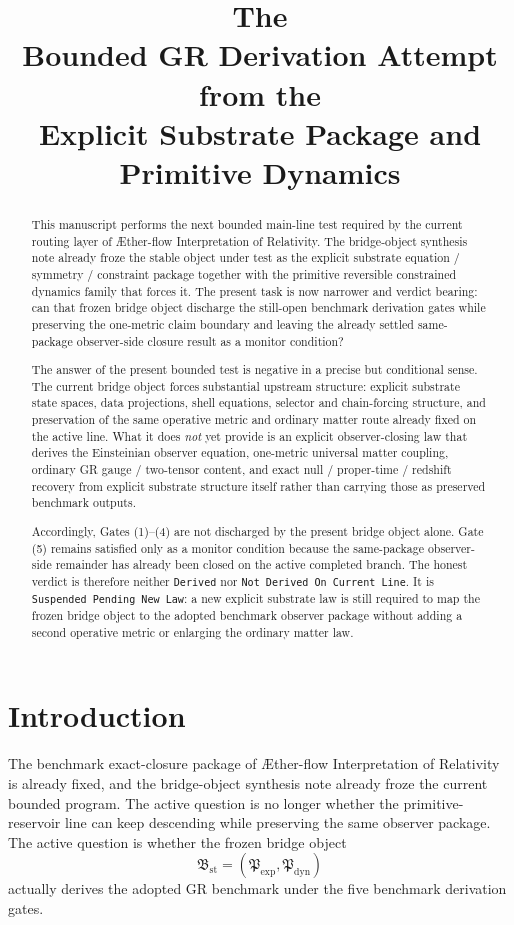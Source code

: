 \documentclass[11pt]{article}
\title{\textbf{The \TheoryName{}}\\[0.4em]
\large Bounded GR Derivation Attempt from the\\
\large Explicit Substrate Package and Primitive Dynamics}
\author{}
\date{}
\newcommand{\Aflow}{\AE{}ther-flow}
\newcommand{\TheoryName}{\Aflow{} Interpretation of Relativity}
\newcommand{\ExplicitPackage}{\mathfrak P_{\mathrm{exp}}}
\newcommand{\PrimitiveFamily}{\mathfrak P_{\mathrm{dyn}}}
\newcommand{\StableBridgeObject}{\mathfrak B_{\mathrm{st}}}
\begin{document}
\maketitle

\begin{abstract}
This manuscript performs the next bounded main-line test required by the current routing layer of \TheoryName{}. The bridge-object synthesis note already froze the stable object under test as the explicit substrate equation / symmetry / constraint package together with the primitive reversible constrained dynamics family that forces it. The present task is now narrower and verdict bearing: can that frozen bridge object discharge the still-open benchmark derivation gates while preserving the one-metric claim boundary and leaving the already settled same-package observer-side closure result as a monitor condition?

The answer of the present bounded test is negative in a precise but conditional sense. The current bridge object forces substantial upstream structure: explicit substrate state spaces, data projections, shell equations, selector and chain-forcing structure, and preservation of the same operative metric and ordinary matter route already fixed on the active line. What it does \emph{not} yet provide is an explicit observer-closing law that derives the Einsteinian observer equation, one-metric universal matter coupling, ordinary GR gauge / two-tensor content, and exact null / proper-time / redshift recovery from explicit substrate structure itself rather than carrying those as preserved benchmark outputs.

Accordingly, Gates (1)--(4) are not discharged by the present bridge object alone. Gate (5) remains satisfied only as a monitor condition because the same-package observer-side remainder has already been closed on the active completed branch. The honest verdict is therefore neither \texttt{Derived} nor \texttt{Not Derived On Current Line}. It is \texttt{Suspended Pending New Law}: a new explicit substrate law is still required to map the frozen bridge object to the adopted benchmark observer package without adding a second operative metric or enlarging the ordinary matter law.
\end{abstract}

\section{Introduction}

The benchmark exact-closure package of \TheoryName{} is already fixed, and the bridge-object synthesis note already froze the current bounded program. The active question is no longer whether the primitive-reservoir line can keep descending while preserving the same observer package. The active question is whether the frozen bridge object
\[
\StableBridgeObject=(\ExplicitPackage,\PrimitiveFamily)
\]
actually derives the adopted GR benchmark under the five benchmark derivation gates.
\end{document}
